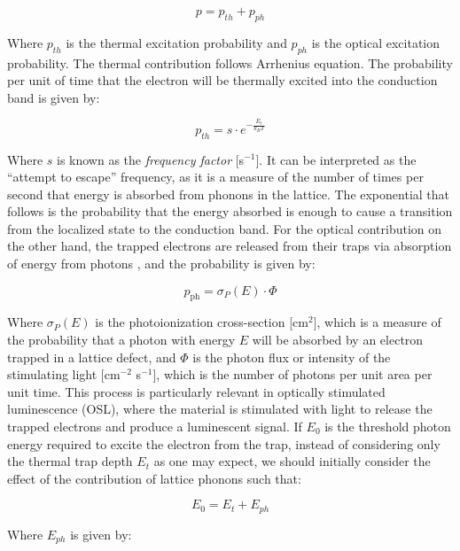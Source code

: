 \begin{equation}
  p = p_{th} + p_{ph}
\end{equation}

Where $p_{th}$ is the thermal excitation probability and $p_{ph}$ is the optical excitation probability. The thermal contribution follows Arrhenius equation. The probability per unit of time that the electron will be thermally excited into the conduction band is given by:

\begin{equation} \label{eq:p_th}
  p_{th} = s \cdot e^{-\frac{E_t}{k_B T}}
\end{equation}

\vspace{10pt}
Where $s$ is known as the \textit{frequency factor} [s$^{-1}$]. It can be interpreted as the ``attempt to escape'' frequency, as it is a measure of the number of times per second that energy is absorbed from phonons in the lattice. The exponential that follows is the probability that the energy absorbed is enough to cause a transition from the localized state to the conduction band. For the optical contribution on the other hand, the trapped electrons are released from their traps via absorption of energy from photons \cite{mckeever_course_2022}, and the probability is given by:

\begin{equation}
  p_{\text{ph}} = \sigma_P(E) \cdot \Phi
\end{equation}

Where $\sigma_P(E)$ is the photoionization cross-section [cm$^2$], which is a measure of the probability that a photon with energy $E$ will be absorbed by an electron trapped in a lattice defect, and $\Phi$ is the photon flux or intensity of the stimulating light [cm$^{-2}$ s$^{-1}$], which is the number of photons per unit area per unit time. This process is particularly relevant in optically stimulated luminescence (OSL), where the material is stimulated with light to release the trapped electrons and produce a luminescent signal. If $E_0$ is the threshold photon energy required to excite the electron from the trap, instead of considering only the thermal trap depth $E_t$ as one may expect, we should initially consider the effect of the contribution of lattice phonons such that:

\begin{equation}
  E_0 = E_t + E_{ph}
\end{equation}

Where $E_{ph}$ is given by:

